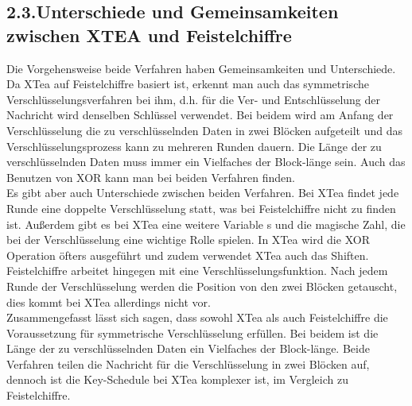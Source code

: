 \documentclass[course=asp]{aspdoc}
\begin{document}
\newpage
\subsection*{2.3.Unterschiede und Gemeinsamkeiten zwischen XTEA und Feistelchiffre}
Die Vorgehensweise beide Verfahren haben Gemeinsamkeiten und Unterschiede. Da XTea auf Feistelchiffre basiert ist, erkennt man auch das symmetrische Verschlüsselungsverfahren bei ihm, d.h. für die Ver- und Entschlüsselung der Nachricht wird denselben Schlüssel verwendet. Bei beidem wird am Anfang der Verschlüsselung die zu verschlüsselnden Daten in zwei Blöcken aufgeteilt und das Verschlüsselungsprozess kann zu mehreren Runden dauern. Die Länge der zu verschlüsselnden Daten muss immer ein Vielfaches der Block-länge sein. Auch das Benutzen von XOR kann man bei beiden Verfahren finden. \\
Es gibt aber auch Unterschiede zwischen beiden Verfahren. Bei XTea findet jede Runde eine doppelte Verschlüsselung statt, was bei Feistelchiffre nicht zu finden ist. Außerdem gibt es bei XTea eine weitere Variable s und die magische Zahl, die bei der Verschlüsselung eine wichtige Rolle spielen. In XTea wird die XOR Operation öfters ausgeführt und zudem verwendet XTea auch das Shiften. Feistelchiffre arbeitet hingegen mit eine Verschlüsselungsfunktion. Nach jedem Runde der Verschlüsselung werden die Position von den zwei Blöcken getauscht, dies kommt bei XTea allerdings nicht vor. \\
Zusammengefasst lässt sich sagen, dass sowohl XTea als auch Feistelchiffre die Voraussetzung für symmetrische Verschlüsselung erfüllen. Bei beidem ist die Länge der zu verschlüsselnden Daten ein Vielfaches der Block-länge. Beide Verfahren teilen die Nachricht für die Verschlüsselung in zwei Blöcken auf, dennoch ist die Key-Schedule bei XTea komplexer ist, im Vergleich zu Feistelchiffre.  
\end{document}
